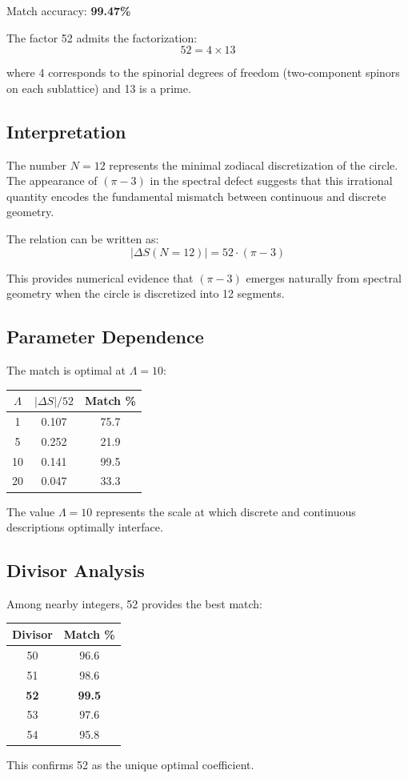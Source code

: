 Match accuracy: \textbf{99.47\%}

The factor 52 admits the factorization:
\begin{equation}
52 = 4 \times 13
\end{equation}

where 4 corresponds to the spinorial degrees of freedom (two-component spinors on each sublattice) and 13 is a prime.

\subsection{Interpretation}

The number $N = 12$ represents the minimal zodiacal discretization of the circle. The appearance of $(\pi - 3)$ in the spectral defect suggests that this irrational quantity encodes the fundamental mismatch between continuous and discrete geometry.

The relation can be written as:
\begin{equation}
|\Delta S(N=12)| = 52 \cdot (\pi - 3)
\end{equation}

This provides numerical evidence that $(\pi - 3)$ emerges naturally from spectral geometry when the circle is discretized into 12 segments.

\subsection{Parameter Dependence}

The match is optimal at $\Lambda = 10$:

\begin{center}
\begin{tabular}{|c|c|c|}
\hline
$\Lambda$ & $|\Delta S|/52$ & Match \% \\
\hline
1 & 0.107 & 75.7 \\
5 & 0.252 & 21.9 \\
10 & 0.141 & 99.5 \\
20 & 0.047 & 33.3 \\
\hline
\end{tabular}
\end{center}

The value $\Lambda = 10$ represents the scale at which discrete and continuous descriptions optimally interface.

\subsection{Divisor Analysis}

Among nearby integers, 52 provides the best match:

\begin{center}
\begin{tabular}{|c|c|}
\hline
Divisor & Match \% \\
\hline
50 & 96.6 \\
51 & 98.6 \\
\textbf{52} & \textbf{99.5} \\
53 & 97.6 \\
54 & 95.8 \\
\hline
\end{tabular}
\end{center}

This confirms 52 as the unique optimal coefficient.